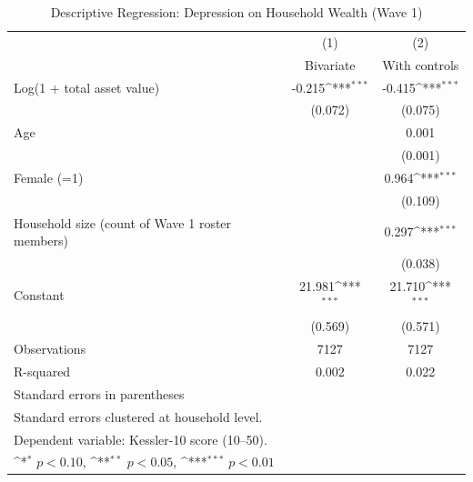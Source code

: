 \begin{table}[htbp]\centering
\def\sym#1{\ifmmode^{#1}\else\(^{#1}\)\fi}
\caption{Descriptive Regression: Depression on Household Wealth (Wave 1)}
\begin{tabular}{l*{2}{c}}
\toprule
                    &\multicolumn{1}{c}{(1)}&\multicolumn{1}{c}{(2)}\\
                    &\multicolumn{1}{c}{Bivariate}&\multicolumn{1}{c}{With controls}\\
\midrule
Log(1 + total asset value)&      -0.215\sym{***}&      -0.415\sym{***}\\
                    &     (0.072)         &     (0.075)         \\
\addlinespace
Age                 &                     &       0.001         \\
                    &                     &     (0.001)         \\
\addlinespace
Female (=1)         &                     &       0.964\sym{***}\\
                    &                     &     (0.109)         \\
\addlinespace
Household size (count of Wave 1 roster members)&                     &       0.297\sym{***}\\
                    &                     &     (0.038)         \\
\addlinespace
Constant            &      21.981\sym{***}&      21.710\sym{***}\\
                    &     (0.569)         &     (0.571)         \\
\midrule
Observations        &        7127         &        7127         \\
R-squared           &       0.002         &       0.022         \\
\bottomrule
\multicolumn{3}{l}{\footnotesize Standard errors in parentheses}\\
\multicolumn{3}{l}{\footnotesize Standard errors clustered at household level.}\\
\multicolumn{3}{l}{\footnotesize Dependent variable: Kessler-10 score (10--50).}\\
\multicolumn{3}{l}{\footnotesize \sym{*} \(p<0.10\), \sym{**} \(p<0.05\), \sym{***} \(p<0.01\)}\\
\end{tabular}
\end{table}

